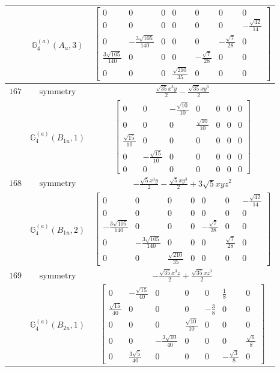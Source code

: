 \documentclass[fleqn,8pt,landscape]{jsarticle}
\begin{document}
\begin{longtable}{ccc}
$  $ & $ \mathbb{G}_{4}^{(a)}(A_{u},3) $ & $ \begin{bmatrix} 0 & 0 & 0 & 0 & 0 & 0 & 0 \\ 0 & 0 & 0 & 0 & 0 & 0 & - \frac{\sqrt{42}}{14} \\ 0 & - \frac{3 \sqrt{105}}{140} & 0 & 0 & 0 & - \frac{\sqrt{7}}{28} & 0 \\ \frac{3 \sqrt{105}}{140} & 0 & 0 & 0 & - \frac{\sqrt{7}}{28} & 0 & 0 \\ 0 & 0 & 0 & \frac{\sqrt{210}}{35} & 0 & 0 & 0 \end{bmatrix} $ \\ \hline
$ 167 $ & $ \text{symmetry} $ & $ \frac{\sqrt{35} x^{3} y}{2} - \frac{\sqrt{35} x y^{3}}{2} $ \\
$  $ & $ \mathbb{G}_{4}^{(a)}(B_{1u},1) $ & $ \begin{bmatrix} 0 & 0 & - \frac{\sqrt{10}}{10} & 0 & 0 & 0 & 0 \\ 0 & 0 & 0 & \frac{\sqrt{10}}{10} & 0 & 0 & 0 \\ \frac{\sqrt{15}}{10} & 0 & 0 & 0 & 0 & 0 & 0 \\ 0 & - \frac{\sqrt{15}}{10} & 0 & 0 & 0 & 0 & 0 \\ 0 & 0 & 0 & 0 & 0 & 0 & 0 \end{bmatrix} $ \\ \hline
$ 168 $ & $ \text{symmetry} $ & $ - \frac{\sqrt{5} x^{3} y}{2} - \frac{\sqrt{5} x y^{3}}{2} + 3 \sqrt{5} x y z^{2} $ \\
$  $ & $ \mathbb{G}_{4}^{(a)}(B_{1u},2) $ & $ \begin{bmatrix} 0 & 0 & 0 & 0 & 0 & 0 & - \frac{\sqrt{42}}{14} \\ 0 & 0 & 0 & 0 & 0 & 0 & 0 \\ - \frac{3 \sqrt{105}}{140} & 0 & 0 & 0 & - \frac{\sqrt{7}}{28} & 0 & 0 \\ 0 & - \frac{3 \sqrt{105}}{140} & 0 & 0 & 0 & \frac{\sqrt{7}}{28} & 0 \\ 0 & 0 & \frac{\sqrt{210}}{35} & 0 & 0 & 0 & 0 \end{bmatrix} $ \\ \hline
$ 169 $ & $ \text{symmetry} $ & $ - \frac{\sqrt{35} x^{3} z}{2} + \frac{\sqrt{35} x z^{3}}{2} $ \\
$  $ & $ \mathbb{G}_{4}^{(a)}(B_{2u},1) $ & $ \begin{bmatrix} 0 & - \frac{\sqrt{15}}{40} & 0 & 0 & 0 & \frac{1}{8} & 0 \\ \frac{\sqrt{15}}{40} & 0 & 0 & 0 & - \frac{3}{8} & 0 & 0 \\ 0 & 0 & 0 & \frac{\sqrt{10}}{10} & 0 & 0 & 0 \\ 0 & 0 & - \frac{3 \sqrt{10}}{40} & 0 & 0 & 0 & \frac{\sqrt{6}}{8} \\ 0 & \frac{3 \sqrt{5}}{40} & 0 & 0 & 0 & - \frac{\sqrt{3}}{8} & 0 \end{bmatrix} $ \\ \hline

\end{longtable}
\end{document}
